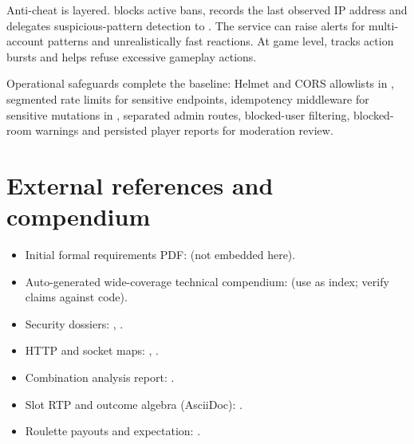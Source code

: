 \documentclass[11pt,a4paper]{article}
\begin{document}
Anti-cheat is layered.  blocks active bans, records the last observed IP address and delegates suspicious-pattern detection to . The service can raise alerts for multi-account patterns and unrealistically fast reactions. At game level,  tracks action bursts and helps refuse excessive gameplay actions.

Operational safeguards complete the baseline: Helmet and CORS allowlists in , segmented rate limits for sensitive endpoints, idempotency middleware for sensitive mutations in , separated admin routes, blocked-user filtering, blocked-room warnings and persisted player reports for moderation review.

\section{External references and compendium}
\label{app:sources}

\begin{itemize}
\item Initial formal requirements PDF:  (not embedded here).
\item Auto-generated wide-coverage technical compendium:  (use as index; verify claims against code).
\item Security dossiers: , .
\item HTTP and socket maps: , .
\item Combination analysis report: .
\item Slot RTP and outcome algebra (AsciiDoc): .
\item Roulette payouts and expectation: .
\end{itemize}
\end{document}
